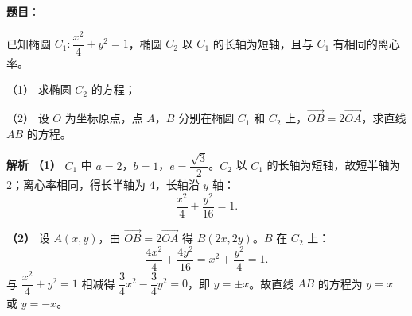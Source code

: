 \begin{answer}

\textbf{题目}：

已知椭圆 $C_1:\dfrac{x^2}4+y^2=1$，椭圆 $C_2$ 以 $C_1$ 的长轴为短轴，且与 $C_1$ 有相同的离心率。

（1） 求椭圆 $C_2$ 的方程；

（2） 设 $O$ 为坐标原点，点 $A$，$B$ 分别在椭圆 $C_1$ 和 $C_2$ 上，$\overrightarrow{OB}=2\overrightarrow{OA}$，求直线 $AB$ 的方程。

\textbf{解析}
\textbf{（1）} $C_1$ 中 $a=2$，$b=1$，$e=\dfrac{\sqrt3}2$。$C_2$ 以 $C_1$ 的长轴为短轴，故短半轴为 $2$；离心率相同，得长半轴为 $4$，长轴沿 $y$ 轴：
\nopagebreak[4]
\[\frac{x^2}4+\frac{y^2}{16}=1.\]

\textbf{（2）} 设 $A(x,y)$，由 $\overrightarrow{OB}=2\overrightarrow{OA}$ 得 $B(2x,2y)$。$B$ 在 $C_2$ 上：
\nopagebreak[4]
\[\frac{4x^2}4+\frac{4y^2}{16}=x^2+\frac{y^2}4=1.\]
与 $\dfrac{x^2}4+y^2=1$ 相减得 $\dfrac34x^2-\dfrac34y^2=0$，即 $y=\pm x$。故直线 $AB$ 的方程为 $y=x$ 或 $y=-x$。



\end{answer}
